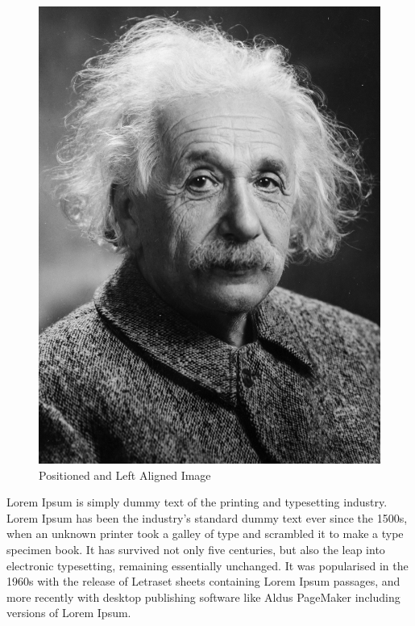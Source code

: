 \documentclass[twocolumn]{article}
\begin{document}
\begin{figure}[htbp]
    \includegraphics{Images/Albert_Einstein.png}
    \caption{Positioned and Left Aligned Image}
\end{figure}
Lorem Ipsum is simply dummy text of the printing and typesetting industry. Lorem Ipsum has been the industry's standard dummy text ever since the 1500s, when an unknown printer took a galley of type and scrambled it to make a type specimen book. It has survived not only five centuries, but also the leap into electronic typesetting, remaining essentially unchanged. It was popularised in the 1960s with the release of Letraset sheets containing Lorem Ipsum passages, and more recently with desktop publishing software like Aldus PageMaker including versions of Lorem Ipsum.


\pagebreak
\end{document}
